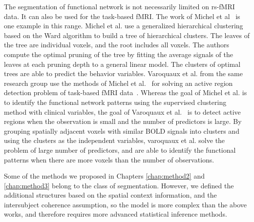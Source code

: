 The segmentation of functional network is not necessarily limited on rs-fMRI
data. It can also be used for the task-based fMRI. The work of Michel et
al~\cite{michel2012supervised} is one example in this range. Michel et al. use a
generalized hierarchical clustering based on the Ward algorithm to build a tree
of hierarchical clusters. The leaves of the tree are individual voxels, and the
root includes all voxels. The authors compute the optimal pruning of the tree by
fitting the average signals of the leaves at each pruning depth to a general
linear model. The clusters of optimal trees are able to predict the behavior
variables. Varoquaux et al. from the same research group use the methods of
Michel et al.~\cite{michel2012supervised} for solving an active region
detection problem of task-based fMRI data~\cite{varoquaux2012small}. Whereas the
goal of Michel et al. is to identify the functional network patterns using the
supervised clustering method with clinical variables, the goal of Varoquaux et
al.~\cite{varoquaux2012small} is to detect active regions when the
observation is small and the number of predictors is large. By grouping
spatially adjacent voxels with similar BOLD signals into clusters and using the
clusters as the independent variables, varoquaux et al. solve the problem of
large number of predictors, and are able to identify the functional patterns when
there are more voxels than the number of observations.


Some of the methods we proposed in Chapters \ref{chap:method2} and
\ref{chap:method3} belong to the class of segmentation. However, we defined the
additional structures based on the spatial context information, and the
intersubject coherence assumption, so the model is more complex than the above
works, and therefore requires more advanced statistical inference methods.

